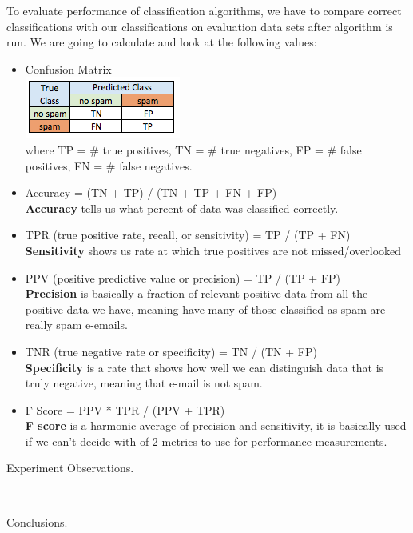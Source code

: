 \documentclass[12pt, letterpaper]{article}
\begin{document}
\begin{enumerate}[label=\Roman*.]
	To evaluate performance of  classification algorithms, we have to compare correct classifications with our classifications on evaluation data sets after algorithm is run. We are going to calculate and look at the following values: 
	\begin{itemize}
		\item Confusion Matrix \\
		{\center \includegraphics[scale=1]{5.png} \\}
		where TP = \# true positives, TN = \# true negatives, FP = \# false positives, FN = \# false negatives.\\
		\item Accuracy = (TN + TP) / (TN + TP + FN + FP)\\
		{\bf Accuracy} tells us what percent of data was classified correctly. \\
		\item TPR (true positive rate, recall, or sensitivity) = TP / (TP + FN)\\
		{\bf Sensitivity} shows us rate at which true positives are not missed/overlooked \\
		\item PPV (positive predictive value or precision) = TP / (TP + FP)\\
		{\bf Precision} is basically a fraction of relevant positive data from all the positive data we have, meaning have many of those classified as spam are really spam e-emails. \\ 
		\item TNR (true negative rate or specificity) = TN / (TN + FP)\\
		{\bf Specificity} is a rate that shows how well we can distinguish data that is truly negative, meaning that e-mail is not spam.\\
		\item F Score = PPV * TPR / (PPV + TPR)\\
		{\bf F score} is a harmonic average of precision and sensitivity, it is basically used if we can't decide with of 2 metrics to use for performance measurements. \\
	\end{itemize}
	
	{\bf \item Experiment Observations. }\\
	
	
	{\bf \item Conclusions.}\\
	
\end{enumerate}
\end{document}
